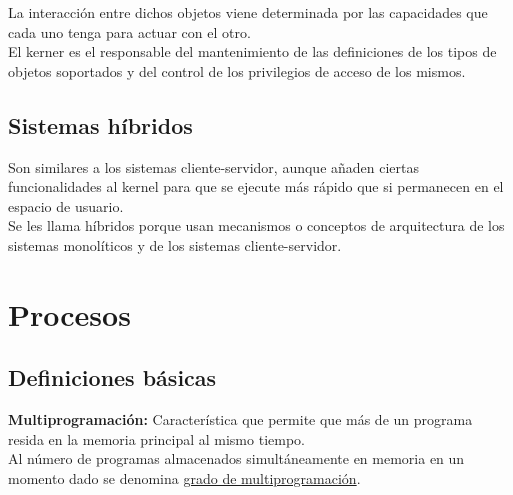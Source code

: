 \documentclass[spanish, 12pt]{article}
\begin{document}
			La interacción entre dichos objetos viene determinada por las capacidades que cada uno tenga para actuar con el otro.\\
			
			El kerner es el responsable del mantenimiento de las definiciones de los tipos de objetos soportados y del control de los privilegios de acceso de los mismos.\\
			
			\centerline{}
			
		\subsection{Sistemas híbridos}
		
			Son similares a los sistemas cliente-servidor, aunque añaden ciertas funcionalidades al kernel para que se ejecute más rápido que si permanecen en el espacio de usuario.\\
			
			Se les llama híbridos porque usan mecanismos o conceptos de arquitectura de los sistemas monolíticos y de los sistemas cliente-servidor.\\
			
			\newpage
			
	\section{Procesos}
	
		\vfill
		
		\subsection{Definiciones básicas}
			
			\textbf{Multiprogramación:} Característica que permite que más de un programa resida en la memoria principal al mismo tiempo.\\
			
			Al número de programas almacenados simultáneamente en memoria en un momento dado se denomina \underline{grado de multiprogramación}.\\
			
\end{document}
